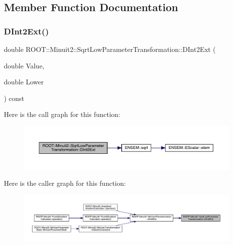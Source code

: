 \subsection{Member Function Documentation}
\mbox{\label{classROOT_1_1Minuit2_1_1SqrtLowParameterTransformation_ade7d793a9299b15dc6e218a11efdb15e}} 
\subsubsection{\texorpdfstring{DInt2Ext()}{DInt2Ext()}\hspace{0.1cm}{\footnotesize\ttfamily [1/3]}}
{\footnotesize\ttfamily double R\+O\+O\+T\+::\+Minuit2\+::\+Sqrt\+Low\+Parameter\+Transformation\+::\+D\+Int2\+Ext (\begin{DoxyParamCaption}\item[{double}]{Value,  }\item[{double}]{Lower }\end{DoxyParamCaption}) const}

Here is the call graph for this function\+:
\nopagebreak
\begin{figure}[H]
\begin{center}
\leavevmode
\includegraphics[width=350pt]{df/db9/classROOT_1_1Minuit2_1_1SqrtLowParameterTransformation_ade7d793a9299b15dc6e218a11efdb15e_cgraph}
\end{center}
\end{figure}
Here is the caller graph for this function\+:
\nopagebreak
\begin{figure}[H]
\begin{center}
\leavevmode
\includegraphics[width=350pt]{df/db9/classROOT_1_1Minuit2_1_1SqrtLowParameterTransformation_ade7d793a9299b15dc6e218a11efdb15e_icgraph}
\end{center}
\end{figure}
\mbox{\label{classROOT_1_1Minuit2_1_1SqrtLowParameterTransformation_ade7d793a9299b15dc6e218a11efdb15e}} 
